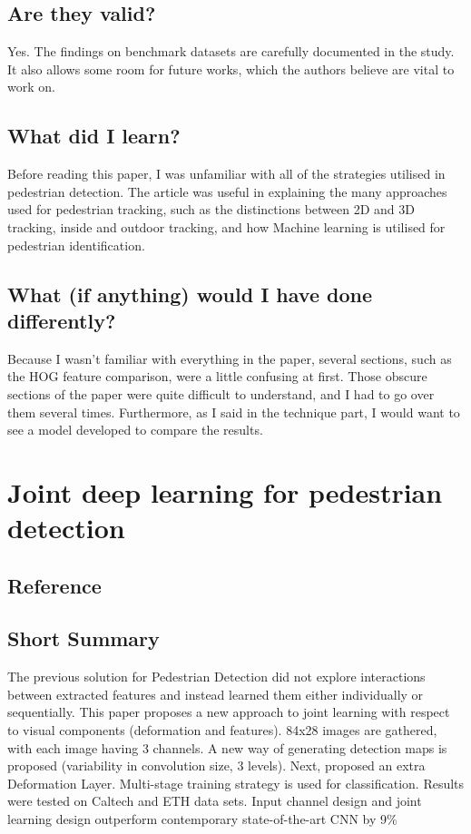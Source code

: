 \documentclass[11pt,a4paper]{article}
\begin{document}
\subsection*{Are they valid?}
Yes. The findings on benchmark datasets are carefully documented in the study. It also allows some room for future works, which the authors believe are vital to work on.

\subsection*{What did I learn?}
Before reading this paper, I was unfamiliar with all of the strategies utilised in pedestrian detection. The article was useful in explaining the many approaches used for pedestrian tracking, such as the distinctions between 2D and 3D tracking, inside and outdoor tracking, and how Machine learning is utilised for pedestrian identification.

\subsection*{What (if anything) would I have done differently?}
Because I wasn't familiar with everything in the paper, several sections, such as the HOG feature comparison, were a little confusing at first. Those obscure sections of the paper were quite difficult to understand, and I had to go over them several times. Furthermore, as I said in the technique part, I would want to see a model developed to compare the results.

\newpage 


\section*{Joint deep learning for pedestrian detection}
\subsection*{Reference}

\subsection*{Short Summary} 
The previous solution for Pedestrian Detection did not explore interactions between extracted features and instead learned them either individually or sequentially. This paper proposes a new approach to joint learning with respect to visual components (deformation and features). 84x28 images are gathered, with each image having 3 channels. A new way of generating detection maps is proposed (variability in convolution size, 3 levels). Next, proposed an extra Deformation Layer. Multi-stage training strategy is used for classification. Results were tested on Caltech and ETH data sets. Input channel design and joint learning design outperform contemporary state-of-the-art CNN by 9\%
\end{document}
